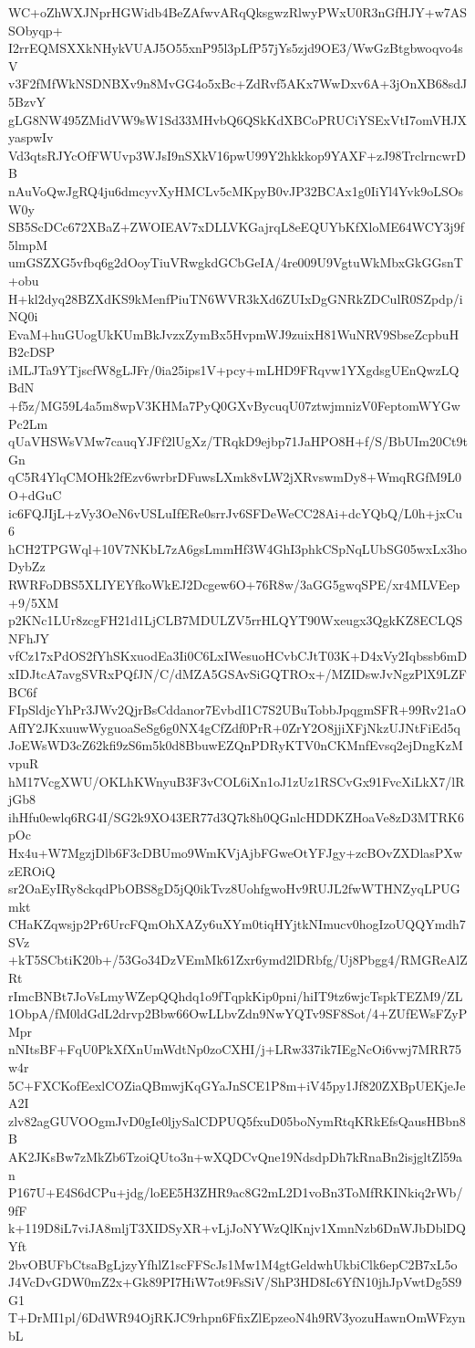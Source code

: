 WC+oZhWXJNprHGWidb4BeZAfwvARqQksgwzRlwyPWxU0R3nGfHJY+w7ASSObyqp+
I2rrEQMSXXkNHykVUAJ5O55xnP95l3pLfP57jYs5zjd9OE3/WwGzBtgbwoqvo4sV
v3F2fMfWkNSDNBXv9n8MvGG4o5xBc+ZdRvf5AKx7WwDxv6A+3jOnXB68sdJ5BzvY
gLG8NW495ZMidVW9sW1Sd33MHvbQ6QSkKdXBCoPRUCiYSExVtI7omVHJXyaspwIv
Vd3qtsRJYcOfFWUvp3WJsI9nSXkV16pwU99Y2hkkkop9YAXF+zJ98TrclrncwrDB
nAuVoQwJgRQ4ju6dmcyvXyHMCLv5cMKpyB0vJP32BCAx1g0IiYl4Yvk9oLSOsW0y
SB5ScDCc672XBaZ+ZWOIEAV7xDLLVKGajrqL8eEQUYbKfXloME64WCY3j9f5lmpM
umGSZXG5vfbq6g2dOoyTiuVRwgkdGCbGeIA/4re009U9VgtuWkMbxGkGGsnT+obu
H+kl2dyq28BZXdKS9kMenfPiuTN6WVR3kXd6ZUIxDgGNRkZDCulR0SZpdp/iNQ0i
EvaM+huGUogUkKUmBkJvzxZymBx5HvpmWJ9zuixH81WuNRV9SbseZcpbuHB2cDSP
iMLJTa9YTjscfW8gLJFr/0ia25ips1V+pcy+mLHD9FRqvw1YXgdsgUEnQwzLQBdN
+f5z/MG59L4a5m8wpV3KHMa7PyQ0GXvBycuqU07ztwjmnizV0FeptomWYGwPc2Lm
qUaVHSWsVMw7cauqYJFf2lUgXz/TRqkD9ejbp71JaHPO8H+f/S/BbUIm20Ct9tGn
qC5R4YlqCMOHk2fEzv6wrbrDFuwsLXmk8vLW2jXRvswmDy8+WmqRGfM9L0O+dGuC
ic6FQJIjL+zVy3OeN6vUSLuIfERe0srrJv6SFDeWeCC28Ai+dcYQbQ/L0h+jxCu6
hCH2TPGWql+10V7NKbL7zA6gsLmmHf3W4GhI3phkCSpNqLUbSG05wxLx3hoDybZz
RWRFoDBS5XLIYEYfkoWkEJ2Dcgew6O+76R8w/3aGG5gwqSPE/xr4MLVEep+9/5XM
p2KNc1LUr8zcgFH21d1LjCLB7MDULZV5rrHLQYT90Wxeugx3QgkKZ8ECLQSNFhJY
vfCz17xPdOS2fYhSKxuodEa3Ii0C6LxIWesuoHCvbCJtT03K+D4xVy2Iqbssb6mD
xIDJtcA7avgSVRxPQfJN/C/dMZA5GSAvSiGQTROx+/MZIDswJvNgzPlX9LZFBC6f
FIpSldjcYhPr3JWv2QjrBsCddanor7EvbdI1C7S2UBuTobbJpqgmSFR+99Rv21aO
AfIY2JKxuuwWyguoaSeSg6g0NX4gCfZdf0PrR+0ZrY2O8jjiXFjNkzUJNtFiEd5q
JoEWsWD3cZ62kfi9zS6m5k0d8BbuwEZQnPDRyKTV0nCKMnfEvsq2ejDngKzMvpuR
hM17VcgXWU/OKLhKWnyuB3F3vCOL6iXn1oJ1zUz1RSCvGx91FvcXiLkX7/lRjGb8
ihHfu0ewlq6RG4I/SG2k9XO43ER77d3Q7k8h0QGnlcHDDKZHoaVe8zD3MTRK6pOc
Hx4u+W7MgzjDlb6F3cDBUmo9WmKVjAjbFGweOtYFJgy+zcBOvZXDlasPXwzEROiQ
sr2OaEyIRy8ckqdPbOBS8gD5jQ0ikTvz8UohfgwoHv9RUJL2fwWTHNZyqLPUGmkt
CHaKZqwsjp2Pr6UrcFQmOhXAZy6uXYm0tiqHYjtkNImucv0hogIzoUQQYmdh7SVz
+kT5SCbtiK20b+/53Go34DzVEmMk61Zxr6ymd2lDRbfg/Uj8Pbgg4/RMGReAlZRt
rImcBNBt7JoVsLmyWZepQQhdq1o9fTqpkKip0pni/hiIT9tz6wjcTspkTEZM9/ZL
1ObpA/fM0ldGdL2drvp2Bbw66OwLLbvZdn9NwYQTv9SF8Sot/4+ZUfEWsFZyPMpr
nNItsBF+FqU0PkXfXnUmWdtNp0zoCXHI/j+LRw337ik7IEgNcOi6vwj7MRR75w4r
5C+FXCKofEexlCOZiaQBmwjKqGYaJnSCE1P8m+iV45py1Jf820ZXBpUEKjeJeA2I
zlv82agGUVOOgmJvD0gIe0ljySalCDPUQ5fxuD05boNymRtqKRkEfsQausHBbn8B
AK2JKsBw7zMkZb6TzoiQUto3n+wXQDCvQne19NdsdpDh7kRnaBn2isjgltZl59an
P167U+E4S6dCPu+jdg/loEE5H3ZHR9ac8G2mL2D1voBn3ToMfRKINkiq2rWb/9fF
k+119D8iL7viJA8mljT3XIDSyXR+vLjJoNYWzQlKnjv1XmnNzb6DnWJbDblDQYft
2bvOBUFbCtsaBgLjzyYfhlZ1scFFScJs1Mw1M4gtGeldwhUkbiClk6epC2B7xL5o
J4VcDvGDW0mZ2x+Gk89PI7HiW7ot9FsSiV/ShP3HD8Ic6YfN10jhJpVwtDg5S9G1
T+DrMI1pl/6DdWR94OjRKJC9rhpn6FfixZlEpzeoN4h9RV3yozuHawnOmWFzynbL
